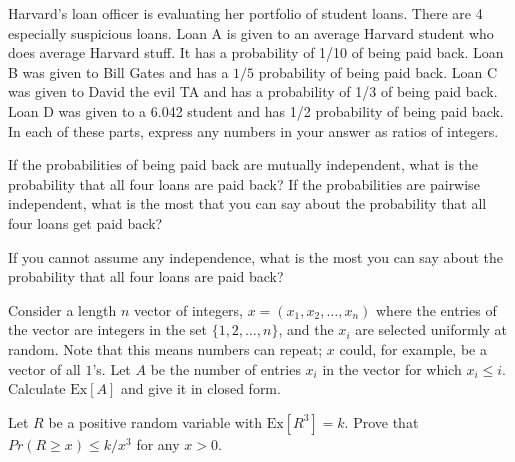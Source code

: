 \documentclass[12pt,oneside]{article}
\begin{document}
\newpage

\begin{problem}{11}
Harvard's loan officer is evaluating her portfolio of student loans.  There are 4 especially suspicious loans.  Loan A is given to an average Harvard student who does average Harvard stuff.  It has a probability of 1/10 of being paid back.  Loan B was given to Bill Gates and has a $1/5$ probability of being paid back.  Loan C was given to David the evil TA and has a probability of 1/3 of being paid back.  Loan D was given to a 6.042 student and has 1/2 probability of being paid back.  In each of these parts, express any numbers in your answer as ratios of integers.

\bparts
	 If the probabilities of being paid back are mutually independent, what is the probability that all four loans are paid back? 
	\vspace{3 in}
	 If the probabilities are pairwise independent, what is the most that you can say about the probability that all four loans get paid back?  

\newpage
	 If you cannot assume any independence, what is the most you can say about the probability that all four loans are paid back?

\eparts
\end{problem}

\newpage
\begin{problem}{10}

Consider a length $n$ vector of integers, $x = (x_1, x_2, \ldots, x_n)$ where the entries
of the vector are integers in the set $\{1, 2, \ldots, n \}$, and the $x_i$ are selected uniformly at random.  Note that this means numbers can repeat; $x$ could, for example, be a vector of all $1$'s.  Let $A$ be the number of entries $x_i$ in the vector for which $x_i \leq i$. 	Calculate $\textrm{Ex}[A]$ and give it in closed form.


\end{problem}

\newpage

\begin{problem}{10}
Let $R$ be a positive random variable with $\textrm{Ex}[R^3] = k$. Prove that $Pr(R \geq x) \leq k/x^3$ for any $x > 0$.
\end{problem}
\newpage
\end{document}
